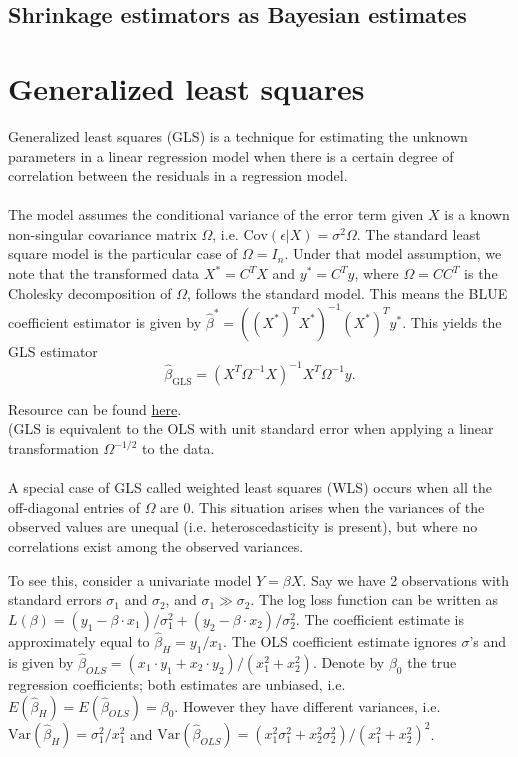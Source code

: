 \documentclass[]{article}
\begin{document}
\subsection{Shrinkage estimators as Bayesian estimates}


\section{Generalized least squares}

Generalized least squares (GLS) is a technique for estimating the unknown parameters in a linear regression model when there is a certain degree of correlation between the residuals in a regression model. \\ \\
The model assumes the conditional variance of the error term given $X$ is a known non-singular covariance matrix $\Omega$, i.e. $\mathrm{Cov}(\epsilon|X)=\sigma^2\Omega$. The standard least square model is the particular case of $\Omega=I_n$. Under that model assumption, we note that the transformed data $X^*=C^T X$ and $y^*=C^T y$, where $\Omega=C C^T$ is the Cholesky decomposition of $\Omega$, follows the standard model. This means the BLUE coefficient estimator is given by $\hat{\beta}^*=((X^*)^TX^*)^{-1}(X^*)^Ty^*$. This yields the GLS estimator
\begin{equation}
\hat{\beta}_{\mathrm{GLS}}=(X^T\Omega^{-1}X)^{-1}X^T\Omega^{-1}y.
\end{equation}

\noindent Resource can be found \href{http://web.vu.lt/mif/a.buteikis/wp-content/uploads/PE_Book/4-7-Multiple-heteroskedastic.html}{here}.\\

(GLS is equivalent to the OLS with unit standard error when applying a linear transformation $\Omega^{-1/2}$ to the data. \\ \\
A special case of GLS called weighted least squares (WLS) occurs when all the off-diagonal entries of $\Omega$ are 0. This situation arises when the variances of the observed values are unequal (i.e. heteroscedasticity is present), but where no correlations exist among the observed variances.

\noindent To see this, consider a univariate model $Y=\beta X$. Say we have 2 observations with standard errors $\sigma_1$ and $\sigma_2$, and $\sigma_1\gg\sigma_2$. The log loss function can be written as $L(\beta) = (y_1-\beta\cdot x_1)/ \sigma_1^2+(y_2-\beta\cdot x_2)/ \sigma_2^2$. The coefficient estimate is approximately equal to $\hat{\beta}_H=y_1/x_1$. The OLS coefficient estimate ignores $\sigma$'s and is given by $\hat{\beta}_{OLS}=(x_1\cdot y_1+x_2\cdot y_2)/ (x_1^2+x_2^2)$. Denote by $\beta_0$ the true regression coefficients; both estimates are unbiased, i.e. $E(\hat{\beta}_H)=E(\hat{\beta}_{OLS})=\beta_0$. However they have different variances, i.e. $\mathrm{Var}(\hat{\beta}_H)=\sigma_1^2/x_1^2$ and $\mathrm{Var}(\hat{\beta}_{OLS})=(x_1^2\sigma_1^2+x_2^2\sigma_2^2)/ (x_1^2+x_2^2)^2$.
\end{document}
